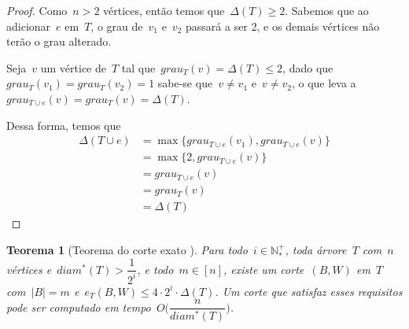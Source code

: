 \documentclass[a4paper,12pt]{article}
\newtheorem{teo}{Teorema}
\begin{document}
	
	\begin{proof}
		Como~$n>2$ vértices, então temos que~$\Delta(T)\ge 2$.
		Sabemos que ao adicionar~$e$ em~$T$, o grau de~$v_1$
		e~$v_2$ passará a ser 2, e os demais vértices não terão
		o grau alterado.
		
		Seja~$v$ um vértice de~$T$ tal 
		que~$grau_T(v) = \Delta(T)\le 2$,
		dado que~$grau_T(v_1)=grau_T(v_2)=1$
		sabe-se que~$v\ne v_1$ e~$v\ne v_2$, o que leva 
		a~$grau_{T\cup e}(v)=grau_T(v)=\Delta(T)$.

		
		Dessa forma, temos que
		\begin{align}
			\Delta(T\cup e) &= \max\{grau_{T\cup e}(v_1), 
			grau_{T\cup e}(v)\}\nonumber\\
         		&= \max\{2, grau_{T\cup e}(v)\} \nonumber\\
				&= grau_{T\cup e}(v) \nonumber\\
         		&= grau_T(v) \nonumber\\
         		&= \Delta(T) \nonumber
		\end{align}		

	\end{proof}

	\bigskip
	\bigskip
	\bigskip

	\begin{teo}[Teorema do corte exato
	{\cite[Theorem 6]{Schmidt15}}]
	\label{teo:corteExato}
		Para todo~$i\in \mathbb{N^+_*}$, toda árvore~$T$ com~$n$
		vértices e~$diam^*(T)>\dfrac{1}{2^i}$, e todo~$m\in[n]$,
		existe um corte~$(B,W)$ em~$T$ com~$|B|=m$ 
		e~$e_T(B,W)\le 4\cdot 2^i\cdot \Delta(T)$.
		Um corte que satisfaz esses requisitos pode ser computado
		em tempo~$O\Big(\dfrac{n}{diam^*(T)}\Big)$.
	\end{teo}

	\medskip
	\medskip
\end{document}

